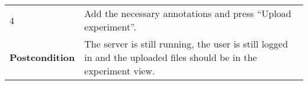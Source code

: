 \begin{longtable}[c]{@{}ll@{}}
\begin{minipage}[t]{0.31\columnwidth}
4
\strut\end{minipage} &
\begin{minipage}[t]{0.63\columnwidth}\raggedright\strut
Add the necessary annotations and press ``Upload experiment''.
\strut\end{minipage}\tabularnewline
\begin{minipage}[t]{0.31\columnwidth}\raggedright\strut
\textbf{Postcondition}
\strut\end{minipage} &
\begin{minipage}[t]{0.63\columnwidth}\raggedright\strut
The server is still running, the user is still logged in and the
uploaded files should be in the experiment view.
\strut\end{minipage}\tabularnewline
\bottomrule
\end{longtable}


